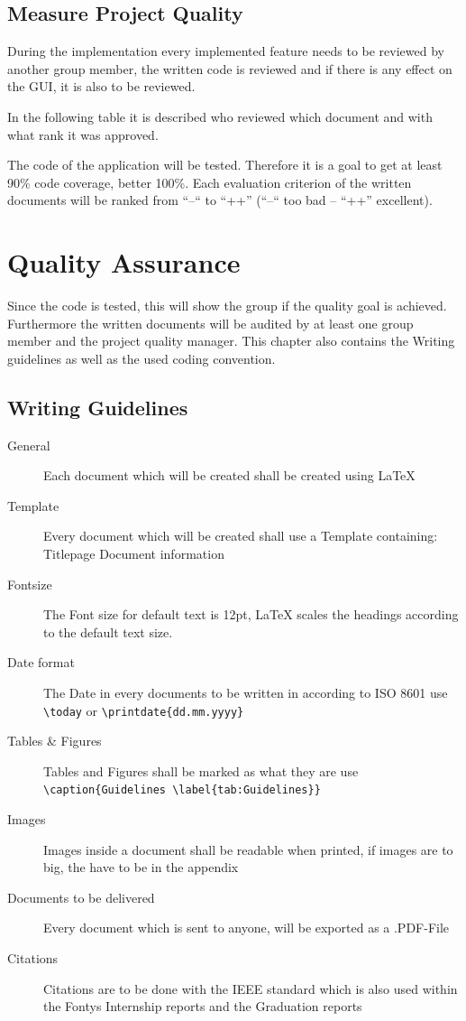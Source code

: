 \documentclass[12pt]{article}
\begin{document}
\subsection{Measure Project Quality}
During the implementation every implemented feature needs to be reviewed by another group member, the written code is reviewed and if there is any effect on the GUI, it is also to be reviewed. 

In the following table it is described who reviewed which document and with what rank it was approved.

The code of the application will be tested. Therefore it is a goal to get at least 90\% code coverage, better 100\%. Each evaluation criterion of the written documents will be ranked from “--“ to “++” (“--“ too bad – “++” excellent).
\clearpage
\section{Quality Assurance}
Since the code is tested, this will show the group if the quality goal is achieved. Furthermore the written documents will be audited by at least one group member and the project quality manager. This chapter also contains the Writing guidelines as well as the used coding convention.
\subsection{Writing Guidelines}
\begin{description}
	\item[General] Each document which will be created shall be created using LaTeX
	\item[Template] Every document which will be created shall use a Template containing:
	\subitem Titlepage
	\subitem Document information
	\item[Fontsize] The Font size for default text is 12pt, LaTeX scales the headings according to the default text size.
	\item[Date format] The Date in every documents to be written in according to ISO 8601
	\subitem use \verb|\today| or \verb|\printdate{dd.mm.yyyy}|
	\item[Tables \& Figures] Tables and Figures shall be marked as what they are
	\subitem use \verb|\caption{Guidelines \label{tab:Guidelines}}|
	\item[Images] Images inside a document shall be readable when printed, if images are to big, the have to be in the appendix
	\item[Documents to be delivered] Every document which is sent to anyone, will be exported as a .PDF-File
	\item[Citations] Citations are to be done with the IEEE standard which is also used within the Fontys Internship reports and the Graduation reports
	
\end{description}
\end{document}
